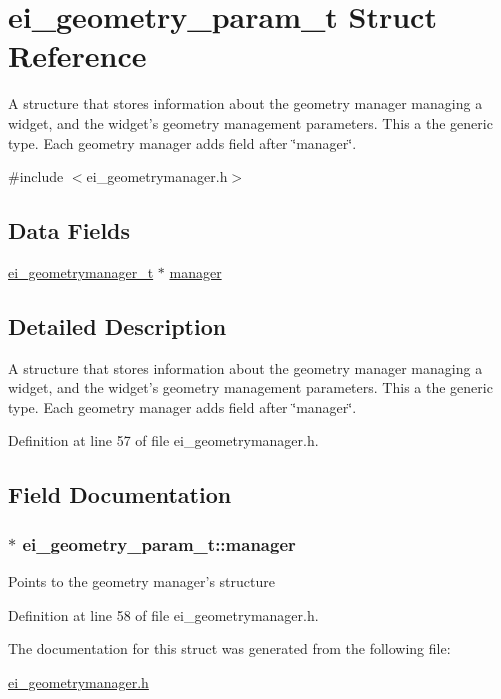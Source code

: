 \hypertarget{structei__geometry__param__t}{\section{ei\+\_\+geometry\+\_\+param\+\_\+t Struct Reference}
\label{structei__geometry__param__t}
}


A structure that stores information about the geometry manager managing a widget, and the widget's geometry management parameters. This a the generic type. Each geometry manager adds field after \char`\"{}manager\char`\"{}.  




{\ttfamily \#include $<$ei\+\_\+geometrymanager.\+h$>$}

\subsection*{Data Fields}
\begin{DoxyCompactItemize}
\item 
\hyperlink{structei__geometrymanager__t}{ei\+\_\+geometrymanager\+\_\+t} $\ast$ \hyperlink{structei__geometry__param__t_a635f77c11000dc23dc8e06256f0b5c0c}{manager}
\end{DoxyCompactItemize}


\subsection{Detailed Description}
A structure that stores information about the geometry manager managing a widget, and the widget's geometry management parameters. This a the generic type. Each geometry manager adds field after \char`\"{}manager\char`\"{}. 

Definition at line 57 of file ei\+\_\+geometrymanager.\+h.



\subsection{Field Documentation}
\hypertarget{structei__geometry__param__t_a635f77c11000dc23dc8e06256f0b5c0c}{
\subsubsection[{manager}]{$\ast$ ei\+\_\+geometry\+\_\+param\+\_\+t\+::manager}}\label{structei__geometry__param__t_a635f77c11000dc23dc8e06256f0b5c0c}
Points to the geometry manager's structure 

Definition at line 58 of file ei\+\_\+geometrymanager.\+h.



The documentation for this struct was generated from the following file\+:\begin{DoxyCompactItemize}
\item 
\hyperlink{ei__geometrymanager_8h}{ei\+\_\+geometrymanager.\+h}\end{DoxyCompactItemize}
